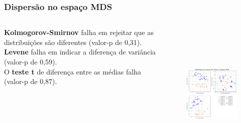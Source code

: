 \documentclass[121pt, aspectratio=169, t]{beamer}
\begin{document}
\begin{frame}[fragile=singleslide]
	\frametitle{Dispersão no espaço MDS}
	
	\begin{columns}
		\begin{column}{0.4\textwidth}
			\textbf{Kolmogorov-Smirnov} falha em rejeitar que as distribuições são diferentes (valor-p de 0,31). \\
			\vspace{0.5cm}
			\textbf{Levene} falha em indicar a diferença de variância (valor-p de 0,59). \\
			\vspace{0.5cm}
			O \textbf{teste t} de diferença entre as médias falha (valor-p de 0,87).\\
		\end{column}
		\begin{column}{0.6\textwidth}  %
				\vspace{-1cm}
			\begin{figure}
				\centering
				\includegraphics[height=7cm]{MDS_01.jpg}
			\end{figure}
		\end{column}
		
	\end{columns}
\end{frame}
\end{document}
